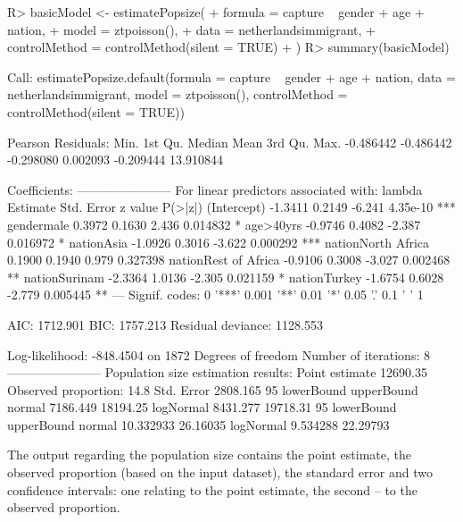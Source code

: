 \documentclass[
]{jss}
\newcommand{\1}{\mathcal{I}} \newcommand{\bZero}{\boldsymbol{0}}
\begin{document}
\begin{CodeChunk}
\begin{CodeInput}
R> basicModel <- estimatePopsize(
+   formula = capture ~ gender + age + nation,
+   model   = ztpoisson(),
+   data    = netherlandsimmigrant,
+   controlMethod = controlMethod(silent = TRUE)
+ )
R> summary(basicModel)
\end{CodeInput}
\begin{CodeOutput}

Call:
estimatePopsize.default(formula = capture ~ gender + age + nation, 
    data = netherlandsimmigrant, model = ztpoisson(), controlMethod = controlMethod(silent = TRUE))

Pearson Residuals:
     Min.   1st Qu.    Median      Mean   3rd Qu.      Max. 
-0.486442 -0.486442 -0.298080  0.002093 -0.209444 13.910844 

Coefficients:
-----------------------
For linear predictors associated with: lambda 
                     Estimate Std. Error z value  P(>|z|)    
(Intercept)           -1.3411     0.2149  -6.241 4.35e-10 ***
gendermale             0.3972     0.1630   2.436 0.014832 *  
age>40yrs             -0.9746     0.4082  -2.387 0.016972 *  
nationAsia            -1.0926     0.3016  -3.622 0.000292 ***
nationNorth Africa     0.1900     0.1940   0.979 0.327398    
nationRest of Africa  -0.9106     0.3008  -3.027 0.002468 ** 
nationSurinam         -2.3364     1.0136  -2.305 0.021159 *  
nationTurkey          -1.6754     0.6028  -2.779 0.005445 ** 
---
Signif. codes:  0 '***' 0.001 '**' 0.01 '*' 0.05 '.' 0.1 ' ' 1

AIC: 1712.901
BIC: 1757.213
Residual deviance: 1128.553

Log-likelihood: -848.4504 on 1872 Degrees of freedom 
Number of iterations: 8
-----------------------
Population size estimation results: 
Point estimate 12690.35
Observed proportion: 14.8%
Std. Error 2808.165
95%
          lowerBound upperBound
normal      7186.449   18194.25
logNormal   8431.277   19718.31
95%
          lowerBound upperBound
normal     10.332933   26.16035
logNormal   9.534288   22.29793
\end{CodeOutput}
\end{CodeChunk}

The output regarding the population size contains the point estimate,
the observed proportion (based on the input dataset), the standard error
and two confidence intervals: one relating to the point estimate, the
second -- to the observed proportion.
\end{document}

